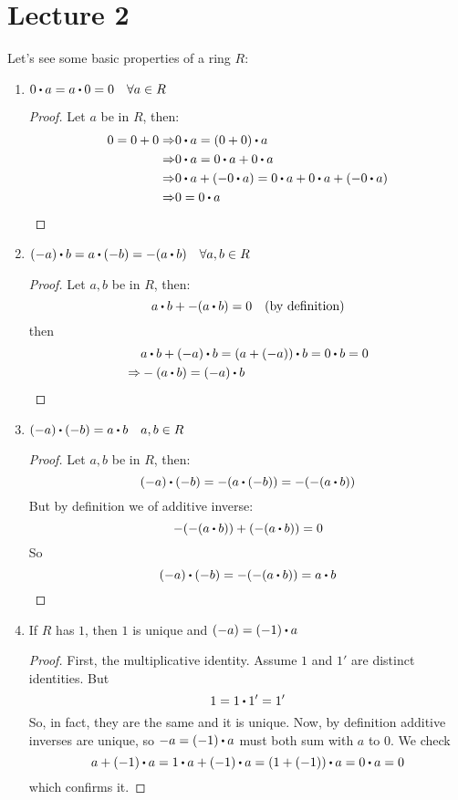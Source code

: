 \documentclass[../Main.tex]{subfiles}
\begin{document}
\chapter{Lecture 2}
Let's see some basic properties of a ring $R$:
\begin{enumerate}
	\item $0\rdot a= a\rdot 0=0 \quad \forall a \in R$
	\begin{proof}
		Let $a$ be in $R$, then:
		\begin{align*}
			0=0+0\Rightarrow & 0\rdot a = (0+0)\rdot a  \\
			\Rightarrow& 0 \rdot a= 0\rdot a + 0\rdot a   \\
			\Rightarrow& 0\rdot a +(-0\rdot a) = 0\rdot a + 0\rdot a + (-0\rdot a)  \\
			\Rightarrow& 0 = 0 \rdot a
		\end{align*}
	\end{proof}
	\item $(-a)\rdot b = a\rdot (-b) = -(a\rdot b) \quad \forall a,b \in R$
	\begin{proof}
		Let $a,b$ be in $R$, then:
		\[a\rdot b + -(a \rdot b) = 0 \quad \textrm{(by definition)}\]
		then
		\begin{align*}
			&a\rdot b +(-a)\rdot b = (a+(-a))\rdot b = 0\rdot b=0\\
			\Rightarrow& -(a\rdot b) = (-a)\rdot b
		\end{align*}
	\end{proof}
	\item $(-a)\rdot (-b)=a\rdot b \quad a,b \in R$
	\begin{proof}
		Let $a,b$ be in $R$, then:
		\[(-a)\rdot (-b) = - (a\rdot (-b)) = -(-(a\rdot b)) \]
		But by definition we of additive inverse:
			\[-(-(a\rdot b))+(-(a\rdot b))=0\]
		So
		\[(-a)\rdot (-b)=-(-(a\rdot b))=a\rdot b\]	
	\end{proof}
	\item If $R$ has $1$, then $1$ is unique and $(-a) = (-1)\rdot a$
	\begin{proof}
		First, the multiplicative identity. Assume $1$ and $1'$ are distinct identities. But
		\[1= 1\rdot 1'=1'\]
		So, in fact, they are the same and it is unique.\newline
		Now, by definition additive inverses are unique, so $-a = (-1)\rdot a$ must both sum with $a$ to $0$. We check 
		\[a+(-1)\rdot a = 1\rdot a + (-1) \rdot  a = (1+(-1))\rdot a = 0\rdot a = 0\]
		which confirms it.
	\end{proof}
\end{enumerate}
\end{document}
